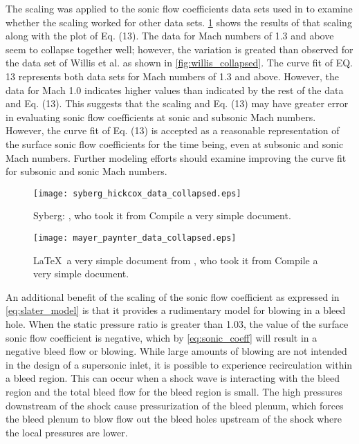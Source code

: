 The scaling was applied to the sonic flow coefficients data sets used in \cite{Syberg1973,Mayer1994} to examine whether the scaling worked for other data sets. \cref{fig:syberg_data_collapsed} shows the results of that scaling along with the plot of Eq. (13). The data for Mach numbers of 1.3 and above seem to collapse together well; however, the variation is greated than observed for the data set of Willis et al. as shown in \cref{fig:willis_collapsed}. The curve fit of EQ. 13 represents both data sets for Mach numbers of 1.3 and above. However, the data for Mach 1.0 indicates higher values than indicated by the rest of the data and Eq. (13). This suggests that the scaling and Eq. (13) may have greater error in evaluating sonic flow coefficients at sonic and subsonic Mach numbers. However, the curve fit of Eq. (13) is accepted as a reasonable representation of the surface sonic flow coefficients for the time being, even at subsonic and sonic Mach numbers. Further modeling efforts should examine improving the curve fit for subsonic and sonic Mach numbers.

\begin{figure}[H] \begin{center}
    \texttt{[image: syberg\_hickcox\_data\_collapsed.eps]}
    \caption{Syberg: \cite{Slater2012}, who took it from \cite{Willis1995} Compile a very simple document.}
     \label{fig:syberg_data_collapsed} \end{center}
\end{figure}

\begin{figure}[H]
 \begin{center}
    \texttt{[image: mayer\_paynter\_data\_collapsed.eps]}
     \caption{\LaTeX\ a very simple document from \cite{Slater2012}, who took it from \cite{Willis1995} Compile a very simple document.}
     \label{fig:mayer_data_collapsed}
 \end{center}
\end{figure}

An additional benefit of the scaling of the sonic flow coefficient as expressed in \cref{eq:slater_model} is that it provides a rudimentary model for blowing in a bleed hole. When the static pressure ratio is greater than 1.03, the value of the surface sonic flow coefficient is negative, which by \cref{eq:sonic_coeff} will result in a negative bleed flow or blowing. While large amounts of blowing are not intended in the design of a supersonic inlet, it is possible to experience recirculation within a bleed region. This can occur when a shock wave is interacting with the bleed region and the total bleed flow for the bleed region is small. The high pressures downstream of the shock cause pressurization of the bleed plenum, which forces the bleed plenum to blow flow out the bleed holes upstream of the shock where the local pressures are lower.

